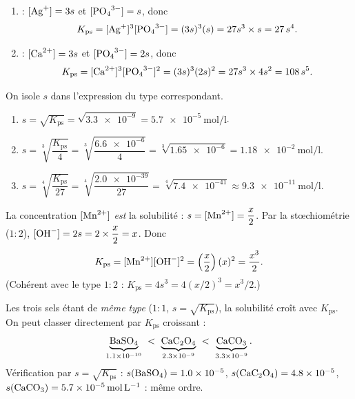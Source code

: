 \documentclass[11pt,a4paper]{article}
\begin{document}
\begin{corrige}
\begin{enumerate}[label=\alph*)]
  \item {} : $[\ce{Ag+}]=3s$ et $[\ce{PO4^{3-}}]=s$, donc
    \[ K_{\mathrm{ps}} = [\ce{Ag+}]^{3}[\ce{PO4^{3-}}] = (3s)^{3}(s) = 27s^{3}\times s = 27\,s^{4}. \]
  \item {} : $[\ce{Ca^{2+}}]=3s$ et $[\ce{PO4^{3-}}]=2s$, donc
    \[ K_{\mathrm{ps}} = [\ce{Ca^{2+}}]^{3}[\ce{PO4^{3-}}]^{2} = (3s)^{3}(2s)^{2}
       = 27s^{3}\times 4s^{2} = 108\,s^{5}. \]
\end{enumerate}
\end{corrige}

\begin{corrige}
On isole $s$ dans l'expression du type correspondant.
\begin{enumerate}[label=\alph*)]
  \item $s = \sqrt{K_{\mathrm{ps}}} = \sqrt{\num{3.3e-9}} = \qty{5.7e-5}{\mole\per\litre}$.
  \item $s = \sqrt[3]{\dfrac{K_{\mathrm{ps}}}{4}} = \sqrt[3]{\dfrac{\num{6.6e-6}}{4}}
           = \sqrt[3]{\num{1.65e-6}} = \qty{1.18e-2}{\mole\per\litre}$.
  \item $s = \sqrt[4]{\dfrac{K_{\mathrm{ps}}}{27}} = \sqrt[4]{\dfrac{\num{2.0e-39}}{27}}
           = \sqrt[4]{\num{7.4e-41}} \approx \qty{9.3e-11}{\mole\per\litre}$.
\end{enumerate}
\end{corrige}

\begin{corrige}
La concentration $[\ce{Mn^{2+}}]$ \emph{est} la solubilité : $s=[\ce{Mn^{2+}}]=\dfrac{x}{2}$. Par la
stœchiométrie ($1{:}2$), $[\ce{OH-}]=2s=2\times\dfrac{x}{2}=x$. Donc
\[ K_{\mathrm{ps}} = [\ce{Mn^{2+}}][\ce{OH-}]^{2} = \left(\dfrac{x}{2}\right)(x)^{2} = \dfrac{x^{3}}{2}. \]
(Cohérent avec le type $1{:}2$ : $K_{\mathrm{ps}}=4s^{3}=4(x/2)^{3}=x^{3}/2$.)
\end{corrige}

\begin{corrige}
Les trois sels étant de \emph{même type} ($1{:}1$, $s=\sqrt{K_{\mathrm{ps}}}$), la solubilité croît avec
$K_{\mathrm{ps}}$. On peut classer directement par $K_{\mathrm{ps}}$ croissant :
\[ \underbrace{\ce{BaSO4}}_{\num{1.1e-10}} \ <\ \underbrace{\ce{CaC2O4}}_{\num{2.3e-9}}
   \ <\ \underbrace{\ce{CaCO3}}_{\num{3.3e-9}}. \]
Vérification par $s=\sqrt{K_{\mathrm{ps}}}$ : $s(\ce{BaSO4})=\qty{1.0e-5}{}$,
$s(\ce{CaC2O4})=\qty{4.8e-5}{}$, $s(\ce{CaCO3})=\qty{5.7e-5}{\mole\per\litre}$ : même ordre.
\end{corrige}
\end{document}
